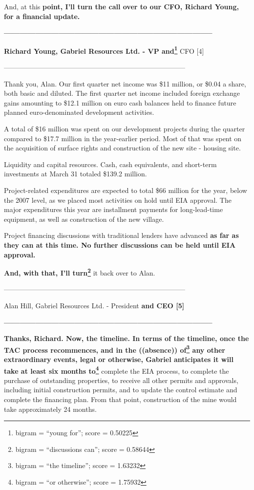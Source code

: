 \documentclass{article}
\begin{document}
 And, at this \textbf{point, I'll turn the call over to our CFO, Richard Young, for a financial update.} 

 \textbf{--------------------------------------------------------------------------------} 

 \textbf{Richard Young, Gabriel Resources Ltd. - VP and\footnote{bigram = ``young for''; score = 0.50225}} CFO [4] 

 -------------------------------------------------------------------------------- 

 Thank you, Alan. Our first quarter net income was \$11 million, or \$0.04 a share, both basic and diluted. The first quarter net income included foreign exchange gains amounting to \$12.1 million on euro cash balances held to finance future planned euro-denominated development activities. 

 A total of \$16 million was spent on our development projects during the quarter compared to \$17.7 million in the year-earlier period. Most of that was spent on the acquisition of surface rights and construction of the new site - housing site. 

 Liquidity and capital resources. Cash, cash equivalents, and short-term investments at March 31 totaled \$139.2 million. 

 Project-related expenditures are expected to total \$66 million for the year, below the 2007 level, as we placed most activities on hold until EIA approval. The major expenditures this year are installment payments for long-lead-time equipment, as well as construction of the new village. 

 Project financing discussions with traditional lenders have advanced \textbf{as far as they can at this time. No further discussions can be held until EIA approval.} 

 \textbf{And, with that, I'll turn\footnote{bigram = ``discussions can''; score = 0.58644}} it back over to Alan. 

 -------------------------------------------------------------------------------- 

 Alan Hill, Gabriel Resources Ltd. - President \textbf{and CEO [5]} 

 \textbf{--------------------------------------------------------------------------------} 

 \textbf{Thanks, Richard. Now, the timeline. In terms of the timeline, once the TAC process recommences, and in the ((absence)) of\footnote{bigram = ``the timeline''; score = 1.63232} any other extraordinary events, legal or otherwise, Gabriel anticipates it will take at least six months to\footnote{bigram = ``or otherwise''; score = 1.75932}} complete the EIA process, to complete the purchase of outstanding properties, to receive all other permits and approvals, including initial construction permits, and to update the control estimate and complete the financing plan. From that point, construction of the mine would take approximately 24 months. 
\end{document}
